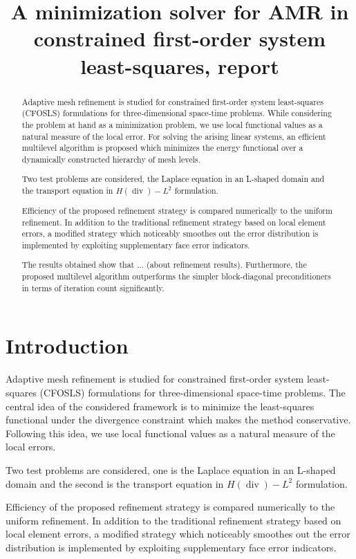 \documentclass[a4paper,12pt]{amsart}
\title[A minimization solver for AMR in CFOSLS, report] 
{A minimization solver for AMR in constrained first-order system least-squares, report}
\numberwithin{equation}{section}
\renewcommand{\div}{\operatorname{div}}
\begin{document}
 
\begin{abstract}
Adaptive mesh refinement is studied for constrained first-order system least-squares (CFOSLS) formulations for three-dimensional space-time problems. While considering the problem at hand as a minimization problem, we use local functional values as a natural measure of the local error. For solving the arising linear systems, an efficient multilevel algorithm is proposed which minimizes the energy functional over a dynamically constructed hierarchy of mesh levels.

Two test problems are considered, the Laplace equation in an L-shaped domain and the transport equation in $H(\div)-L^2$ formulation.

Efficiency of the proposed refinement strategy is compared numerically to the uniform refinement. In addition to the traditional refinement strategy based on local element errors, a modified strategy which noticeably smoothes out the error distribution is implemented by exploiting supplementary face error indicators.

The results obtained show that ... (about refinement results). Furthermore, the proposed multilevel algorithm outperforms the simpler block-diagonal preconditioners in terms of iteration count significantly.
\end{abstract}
\maketitle

\section{Introduction}

Adaptive mesh refinement is studied for constrained first-order system least-squares (CFOSLS) formulations for three-dimensional space-time problems. The central idea of the considered framework is to minimize the least-squares functional under the divergence constraint which makes the method conservative. Following this idea, we use local functional values as a natural measure of the local errors.

Two test problems are considered, one is the Laplace equation in an L-shaped domain and the second is the transport equation in $H(\div)-L^2$ formulation.

Efficiency of the proposed refinement strategy is compared numerically to the uniform refinement. In addition to the traditional refinement strategy based on local element errors, a modified strategy which noticeably smoothes out the error distribution is implemented by exploiting supplementary face error indicators.
\end{document}
